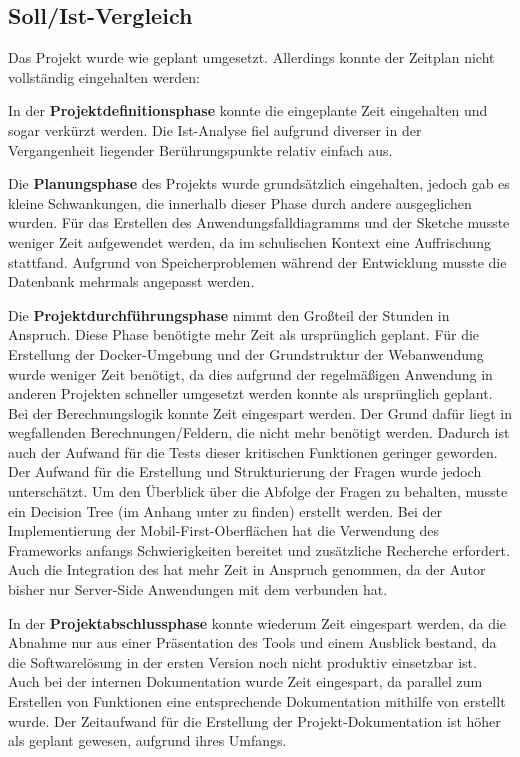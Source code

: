 \subsection{Soll/Ist-Vergleich}
\label{sec:Abschlussphase:Soll/Ist-Vergleich}

Das Projekt wurde wie geplant umgesetzt. Allerdings konnte der Zeitplan nicht vollständig eingehalten werden:

In der \textbf{Projektdefinitionsphase} konnte die eingeplante Zeit eingehalten und sogar verkürzt werden. Die Ist-Analyse fiel aufgrund diverser in der Vergangenheit liegender Berührungspunkte relativ einfach aus.

Die \textbf{Planungsphase} des Projekts wurde grundsätzlich eingehalten, jedoch gab es kleine Schwankungen, die innerhalb dieser Phase durch andere ausgeglichen wurden. Für das Erstellen des Anwendungsfalldiagramms und der Sketche musste weniger Zeit aufgewendet werden, da im schulischen Kontext eine Auffrischung stattfand. Aufgrund von Speicherproblemen während der Entwicklung musste die Datenbank mehrmals angepasst werden.

Die \textbf{Projektdurchführungsphase} nimmt den Großteil der Stunden in Anspruch. Diese Phase benötigte mehr Zeit als ursprünglich geplant. Für die Erstellung der Docker-Umgebung und der Grundstruktur der Webanwendung wurde weniger Zeit benötigt, da dies aufgrund der regelmäßigen Anwendung in anderen Projekten schneller umgesetzt werden konnte als ursprünglich geplant. Bei der Berechnungslogik konnte Zeit eingespart werden. Der Grund dafür liegt in wegfallenden Berechnungen/Feldern, die nicht mehr benötigt werden. Dadurch ist auch der Aufwand für die Tests dieser kritischen Funktionen geringer geworden. Der Aufwand für die Erstellung und Strukturierung der Fragen wurde jedoch unterschätzt. Um den Überblick über die Abfolge der Fragen zu behalten, musste ein Decision Tree (im Anhang unter  zu finden) erstellt werden. Bei der Implementierung der Mobil-First-Oberflächen hat die Verwendung des Frameworks  anfangs Schwierigkeiten bereitet und zusätzliche Recherche erfordert. Auch die Integration des  hat mehr Zeit in Anspruch genommen, da der Autor bisher nur Server-Side Anwendungen mit dem  verbunden hat. 

In der \textbf{Projektabschlussphase} konnte wiederum Zeit eingespart werden, da die Abnahme nur aus einer Präsentation des Tools und einem Ausblick bestand, da die Softwarelösung in der ersten Version noch nicht produktiv einsetzbar ist. Auch bei der internen Dokumentation wurde Zeit eingespart, da parallel zum Erstellen von Funktionen eine entsprechende Dokumentation mithilfe von  erstellt wurde. Der Zeitaufwand für die Erstellung der Projekt-Dokumentation ist höher als geplant gewesen, aufgrund ihres Umfangs.

